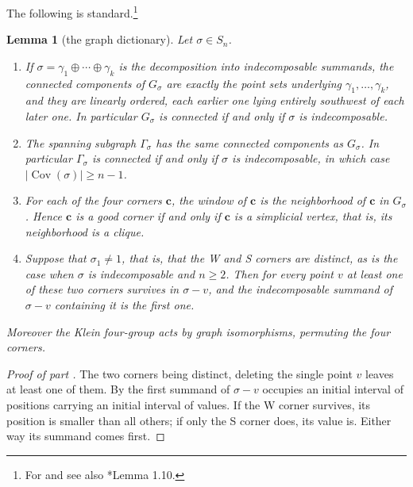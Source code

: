 \documentclass[12pt]{article}
\def\xspace{ }%
\newtheorem{lemma}[lemma]{Lemma}
\theoremstyle{definition}
\newcommand{\good}{good\xspace}
\newcommand{\Cov}{\operatorname{Cov}}  %
\newcommand{\Wcr}{W\xspace}    %
\newcommand{\Scr}{S\xspace}    %
\newcommand{\crn}{\mathbf{c}}              %
\newcommand{\cgr}{\Gamma}                 %
\newcommand{\igr}{G}                      %
\begin{document}
The following is standard.\footnote{For  and  see also
\cite{MR1317469}*{Lemma 1.10}.}

\begin{lemma}[the graph dictionary]\label{lem:dict}
Let $\sigma \in S_n$.
\begin{enumerate}
\item\label{dict:comp} If $\sigma = \gamma_1 \oplus \cdots \oplus
\gamma_k$ is the decomposition into indecomposable summands, the
connected components of
$\igr_\sigma$ are exactly the point sets underlying $\gamma_1,\dots,
\gamma_k$, and they are linearly ordered, each earlier one lying entirely
southwest of each later one. In particular $\igr_\sigma$ is connected if and
only if $\sigma$ is indecomposable.
\item\label{dict:cover} The spanning subgraph $\cgr_\sigma$ has the same
connected components as $\igr_\sigma$. In particular $\cgr_\sigma$ is
connected if and only if $\sigma$ is indecomposable, in which case
$|\Cov(\sigma)| \ge n-1$.
\item\label{dict:corner} For each of the four corners $\crn$, the window of
$\crn$ is the neighborhood of $\crn$ in $\igr_\sigma$. Hence $\crn$ is a \good corner
if and only
if $\crn$ is a \emph{simplicial} vertex, that is, its neighborhood is a
clique.
\item\label{dict:sumorder} Suppose that $\sigma_1 \ne 1$, that is, that
the \Wcr and \Scr corners are distinct, as is the case when $\sigma$ is
indecomposable and $n \ge 2$. Then for every point $v$ at least one of
these two corners survives in $\sigma - v$, and the indecomposable
summand of $\sigma - v$ containing it is the first one.
\end{enumerate}
Moreover the Klein four-group acts by graph isomorphisms, permuting the
four corners.
\end{lemma}


\begin{proof}[Proof of part ]
The two corners being distinct, deleting the single point $v$ leaves at
least one of them. By  the first summand of $\sigma
- v$ occupies an initial interval of positions carrying an initial
interval of values. If the \Wcr corner survives, its position is smaller
than all others; if only the \Scr corner does, its value is. Either way
its summand comes first.
\end{proof}
\end{document}
